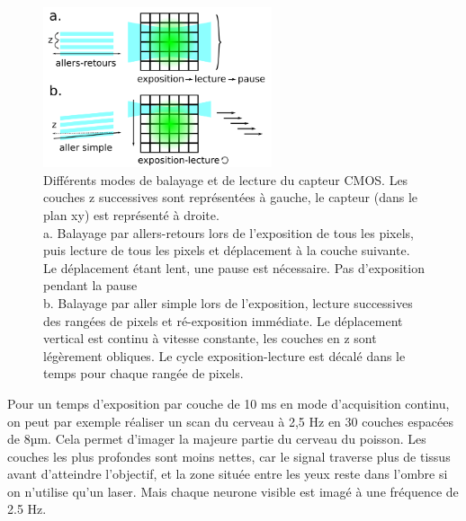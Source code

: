 \begin{figure}
\centering
\includegraphics[width=0.6\textwidth]{./files/schema_balayage.svg.png}
\caption{Différents modes de balayage et de lecture du capteur CMOS. Les couches z successives sont représentées à gauche, le capteur (dans le plan xy) est représenté à droite.\\
a. Balayage par allers-retours lors de l'exposition de tous les pixels, puis lecture de tous les pixels et déplacement à la couche suivante. Le déplacement étant lent, une pause est nécessaire. Pas d'exposition pendant la pause\\
b. Balayage par aller simple lors de l'exposition, lecture successives des rangées de pixels et ré-exposition immédiate. Le déplacement vertical est continu à vitesse constante, les couches en z sont légèrement obliques. Le cycle exposition-lecture est décalé dans le temps pour chaque rangée de pixels.}
\end{figure}

Pour un temps d'exposition par couche de 10 ms en mode d'acquisition continu, on peut par exemple réaliser un scan du cerveau à 2,5 Hz en 30 couches espacées de 8µm. Cela permet d'imager la majeure partie du cerveau du poisson. Les couches les plus profondes sont moins nettes, car le signal traverse plus de tissus avant d'atteindre l'objectif, et la zone située entre les yeux reste dans l'ombre si on n'utilise qu'un laser. Mais chaque neurone visible est imagé à une fréquence de 2.5 Hz.









